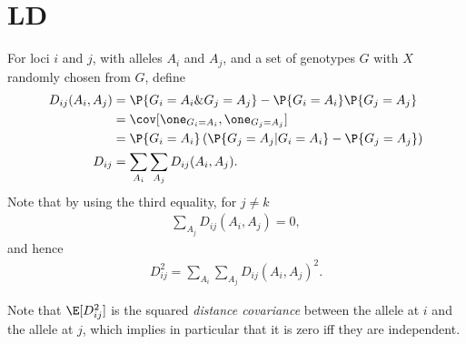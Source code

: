 \section{LD}

For loci $i$ and $j$, with alleles $A_i$ and $A_j$, 
and a set of genotypes $G$ with $X$ randomly chosen from $G$,
define
\begin{align}
    D_{ij}(A_i,A_j) &= \P\{ G_i = A_i \& G_j = A_j \} - \P\{ G_i = A_i \} \P\{ G_j = A_j \} \\
        &= \cov[ \one_{G_i=A_i}, \one_{G_j=A_j} ] \\
        &= \P\{ G_i = A_i \} \left( \P\{ G_j = A_j \vert G_i = A_i \} - \P\{ G_j = A_j \}  \right) \\
    D_{ij} &= \sum_{A_i} \sum_{A_j} D_{ij}(A_i,A_j) .
\end{align}
Note that by using the third equality, for $j \neq k$
\begin{align}
    \sum_{A_j} D_{ij}(A_i,A_j) = 0 ,
\end{align}
and hence
\begin{align}
    D_{ij}^2 = \sum_{A_i} \sum_{A_j}  D_{ij}(A_i,A_j)^2 .
\end{align}

Note that $\E[D_{ij}^2]$ is the squared \emph{distance covariance} between the allele at $i$ and the allele at $j$,
which implies in particular that it is zero iff they are independent.
